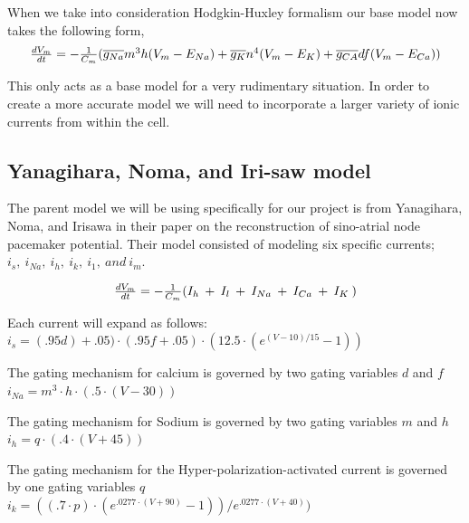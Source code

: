 \documentclass{bmcart}%
\begin{document}
 When we take into consideration Hodgkin-Huxley formalism our base model now takes the following form, 
\begin{equation}
\\
$$
\frac {d V_m}{d t} = - \frac {1}{C_m} (\overline{g_{Na}} m^3 h (V_m - E_{Na}) + \overline{g_K} n^4 (V_m - E_{K}) +  \overline{g_{CA}} df (V_m - E_{Ca}))
$$
\label{ModelBaseFinal}
\end{equation}

This only acts as a base model for a very rudimentary situation. In order to create a more accurate model we will need to incorporate a larger variety of ionic currents from within the cell.
\\

\subsection*{Yanagihara, Noma, and Iri-saw model}

The parent model we will be using specifically for our project is from Yanagihara, Noma, and Irisawa in their paper on the reconstruction of sino-atrial node pacemaker potential. Their model consisted of modeling six specific currents; \begin{math} i_s,\: i_{Na},\: i_h,\: i_k,\: i_1,\: and \: i_m \end{math}\cite{Yanaghara1980}. 

\begin{equation}
\\
$$
\frac {d V_m}{d t} = - \frac {1}{C_m}(I_h \: + \: I_l \: + \: I_{Na} \: + \: I_{Ca} \: + \: I_K \:)
$$
\label{YangBase}
\end{equation}  


Each current will expand as follows:
\\
$i_s = (.95d)+.05)\cdot(.95f+.05)\cdot (12.5 \cdot (e^{(V - 10)/15} - 1)) $

The gating mechanism for calcium is governed by two gating variables $d$ and $f$
\\
$i_{Na} = m^3\cdot h \cdot (.5 \cdot (V - 30))$

The gating mechanism for Sodium is governed by two gating variables $m$ and $h$
\\
$i_h = q \cdot (.4 \cdot (V + 45))$

The gating mechanism for the Hyper-polarization-activated current is governed by one gating variables $q$
\\
$i_k = ((.7 \cdot p) \cdot (e^{.0277\cdot(V+90)}-1))/e^{.0277 \cdot (V + 40)})$
\end{document}

